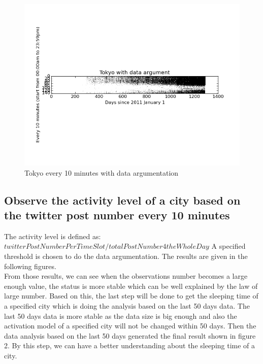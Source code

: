 \documentclass[a4paper,12pt]{article}
\begin{document}
   \begin{figure}[H]
  \begin{center}
      \includegraphics[scale=0.8]{1Tokyobinary.png}
\end{center}
\caption{Tokyo every 10 minutes with data argumentation}
 \label {fig:2}
 \end{figure}
 
 
  \subsection{Observe the activity level of a city based on the twitter post number every 10 minutes}
  
  The activity level is defined as: $twitter Post Number Per Time Slot /totalPostNumber4theWholeDay$ A specified threshold is chosen to do the data argumentation. The results are given in the following figures.\\
  
  From those results, we can see when the observations number becomes a large enough value, the status is more stable which can be well explained by the law of large number. Based on this, the last step will be done to get the sleeping time of a specified city which is doing the analysis based on the last 50 days data. The last 50 days data is more stable as the data size is big enough and also the activation model of a specified city will not be changed within 50 days. Then the data analysis based on the last 50 days generated the final result shown in figure 2. By this step, we can have a better understanding about  the sleeping time of a city.\\
  
\end{document}
